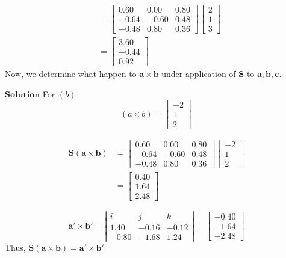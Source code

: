 \documentclass{article}
\begin{document}
\begin{flushleft}
$$\begin{aligned}
&=\begin{bmatrix}
0.60 & 0.00 & 0.80 \\
-0.64 & -0.60 & 0.48 \\
-0.48 & 0.80 & 0.36
\end{bmatrix}\begin{bmatrix}
2 \\
1 \\
3
\end{bmatrix} \\
&=\begin{bmatrix}
3.60 \\
-0.44 \\
0.92
\end{bmatrix}
\end{aligned}
$$
Now, we determine what happen to $\mathbf{a} \times \mathbf{b}$ under application of $\mathbf{S}$ to $\mathbf{a}, \mathbf{b}, \mathbf{c}$.


$\boxed{\textbf{Solution}}$ For $(b)$
$$(a\times b)=\begin{bmatrix}
-2 \\
1 \\
2
\end{bmatrix}$$

$$
\begin{aligned}
\mathbf{S}(\mathbf{a} \times \mathbf{b}) &=\begin{bmatrix}
0.60 & 0.00 & 0.80 \\
-0.64 & -0.60 & 0.48 \\
-0.48 & 0.80 & 0.36
\end{bmatrix}\begin{bmatrix}
-2 \\
1 \\
2
\end{bmatrix} \\
&=\begin{bmatrix}
0.40 \\
1.64 \\
2.48
\end{bmatrix}
\end{aligned}
$$

$$
\mathbf{a}' \times \mathbf{b}'=\left|\begin{array}{ccc}
i & j & k \\
1.40 & -0.16 & -0.12 \\
-0.80 & -1.68 & 1.24
\end{array}\right|=\begin{bmatrix}
-0.40 \\
-1.64 \\
-2.48
\end{bmatrix}
$$
Thus, $\mathbf{S}(\mathbf{a} \times \mathbf{b})=\mathbf{a}' \times \mathbf{b}'$


\end{flushleft}
\end{document}
